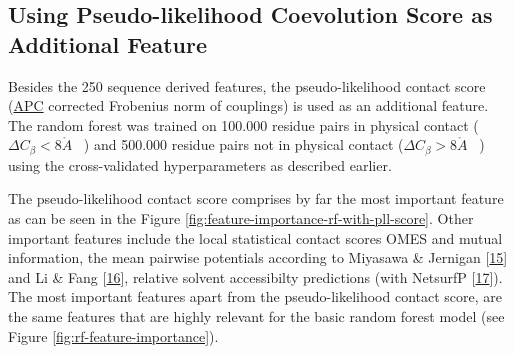 \documentclass[12pt,a4paper,twoside]{book}
\newcommand{\Cb}{C_\beta}
\newcommand{\angstrom}{\mathring{A} \;}
\theoremstyle{definition}
\theoremstyle{definition}
\theoremstyle{remark}
\begin{document}
\subsection{Using Pseudo-likelihood Coevolution Score as Additional
Feature}\label{rf-with-pll-score}

Besides the 250 sequence derived features, the pseudo-likelihood contact
score (\protect\hyperlink{abbrev}{APC} corrected Frobenius norm of
couplings) is used as an additional feature. The random forest was
trained on 100.000 residue pairs in physical contact
(\(\Delta \Cb < 8 \angstrom \; \;\)) and 500.000 residue pairs not in
physical contact (\(\Delta \Cb > 8 \angstrom \; \;\)) using the
cross-validated hyperparameters as described earlier.

The pseudo-likelihood contact score comprises by far the most important
feature as can be seen in the Figure
\ref{fig:feature-importance-rf-with-pll-score}. Other important features
include the local statistical contact scores OMES and mutual
information, the mean pairwise potentials according to Miyasawa \&
Jernigan {[}\protect\hyperlink{ref-Miyazawa1999a}{15}{]} and Li \& Fang
{[}\protect\hyperlink{ref-Li2011}{16}{]}, relative solvent accessibilty
predictions (with NetsurfP
{[}\protect\hyperlink{ref-Petersen2009a}{17}{]}). The most important
features apart from the pseudo-likelihood contact score, are the same
features that are highly relevant for the basic random forest model (see
Figure \ref{fig:rf-feature-importance}).
\end{document}
